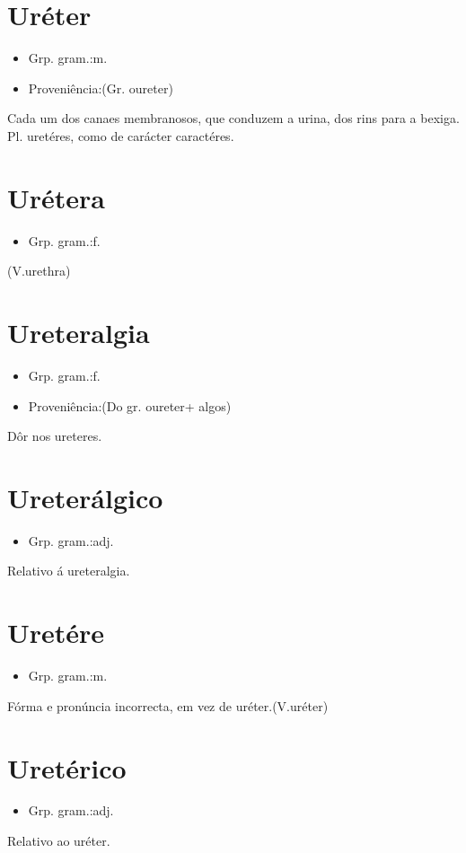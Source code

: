 \documentclass{article}
\begin{document}
\section{Uréter}
\begin{itemize}
\item {Grp. gram.:m.}
\end{itemize}
\begin{itemize}
\item {Proveniência:(Gr. \textunderscore oureter\textunderscore )}
\end{itemize}
Cada um dos canaes membranosos, que conduzem a urina, dos rins para a bexiga.
Pl. \textunderscore uretéres\textunderscore , como de \textunderscore carácter caractéres\textunderscore .
\section{Urétera}
\begin{itemize}
\item {Grp. gram.:f.}
\end{itemize}
(V.urethra)
\section{Ureteralgia}
\begin{itemize}
\item {Grp. gram.:f.}
\end{itemize}
\begin{itemize}
\item {Proveniência:(Do gr. \textunderscore oureter\textunderscore  + \textunderscore algos\textunderscore )}
\end{itemize}
Dôr nos ureteres.
\section{Ureterálgico}
\begin{itemize}
\item {Grp. gram.:adj.}
\end{itemize}
Relativo á ureteralgia.
\section{Uretére}
\begin{itemize}
\item {Grp. gram.:m.}
\end{itemize}
Fórma e pronúncia incorrecta, em vez de \textunderscore uréter\textunderscore .(V.uréter)
\section{Uretérico}
\begin{itemize}
\item {Grp. gram.:adj.}
\end{itemize}
Relativo ao uréter.
\end{document}
